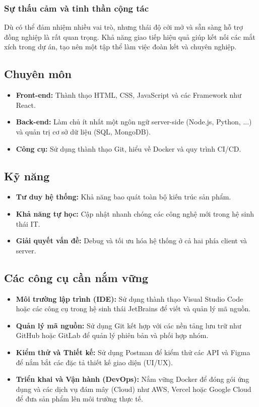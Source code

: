 \documentclass[12pt,a4paper]{article}
\begin{document}
\subsubsection{Sự thấu cảm và tinh thần cộng tác}
\hspace{0.7cm}Dù có thể đảm nhiệm nhiều vai trò, nhưng thái độ cởi mở và sẵn sàng hỗ trợ đồng nghiệp là rất quan trọng. Khả năng giao tiếp hiệu quả giúp kết nối các mắt xích trong dự án, tạo nên một tập thể làm việc đoàn kết và chuyên nghiệp.

\subsection{Chuyên môn}

\begin{itemize}
    \item \textbf{Front-end:} Thành thạo HTML, CSS, JavaScript và các Framework như React.
    \item \textbf{Back-end:} Làm chủ ít nhất một ngôn ngữ server-side (Node.js, Python, ...) và quản trị cơ sở dữ liệu (SQL, MongoDB).
    \item \textbf{Công cụ:} Sử dụng thành thạo Git, hiểu về Docker và quy trình CI/CD.
\end{itemize}

\subsection{Kỹ năng}

\begin{itemize}
    \item \textbf{Tư duy hệ thống:} Khả năng bao quát toàn bộ kiến trúc sản phẩm.
    \item \textbf{Khả năng tự học:} Cập nhật nhanh chóng các công nghệ mới trong hệ sinh thái IT.
    \item \textbf{Giải quyết vấn đề:} Debug và tối ưu hóa hệ thống ở cả hai phía client và server.
\end{itemize}

\subsection{Các công cụ cần nắm vững}

\begin{itemize}
    \item \textbf{Môi trường lập trình (IDE):} Sử dụng thành thạo Visual Studio Code hoặc các công cụ trong hệ sinh thái JetBrains để viết và quản lý mã nguồn.
    \item \textbf{Quản lý mã nguồn:} Sử dụng Git kết hợp với các nền tảng lưu trữ như GitHub hoặc GitLab để quản lý phiên bản và phối hợp nhóm.
    \item \textbf{Kiểm thử và Thiết kế:} Sử dụng Postman để kiểm thử các API và Figma để nắm bắt các đặc tả thiết kế giao diện (UI/UX).
    \item \textbf{Triển khai và Vận hành (DevOps):} Nắm vững Docker để đóng gói ứng dụng và các dịch vụ đám mây (Cloud) như AWS, Vercel hoặc Google Cloud để đưa sản phẩm lên môi trường thực tế.
\end{itemize}
\end{document}
